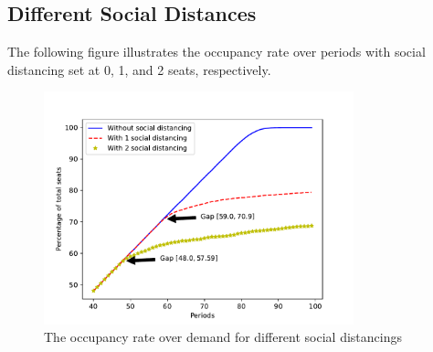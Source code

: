 \subsection*{Different Social Distances}
The following figure illustrates the occupancy rate over periods with social distancing set at 0, 1, and 2 seats, respectively.

\begin{figure}[h]
  \centering
    \includegraphics[width=0.8\textwidth]{./Figures/distance.pdf}
  \caption{The occupancy rate over demand for different social distancings}
\end{figure}



